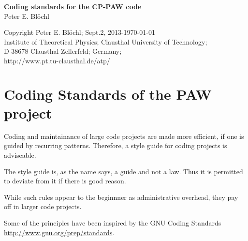 \documentclass[11pt,a4paper]{report}
\begin{document}
\begin{titlepage}
\begin{center}
\vspace*{3.5cm}
{\huge \textbf{Coding standards for the CP-PAW code}}\\
\vspace{0.5cm}
{\large Peter E. Bl\"ochl}
\vspace{0.5cm} 
\end{center}

\vfill
\begin{center}
Copyright Peter E. Bl\"ochl; Sept.2, 2013-\today\\
{\small
Institute of Theoretical Physics;
Clausthal University of Technology;\\ 
D-38678 Clausthal Zellerfeld; Germany;\\
http://www.pt.tu-clausthal.de/atp/}
\end{center}
\end{titlepage}
\noindent            
\tableofcontents
\chapter{Coding Standards of the PAW project}
Coding and maintainance of large code projects are made more
efficient, if one is guided by recurring patterns. Therefore, a style
guide for coding projects is adviseable.

The style guide is, as the name says, a guide and not a law. Thus it
is permitted to deviate from it if there is good reason.

While such rules appear to the beginnner as administrative overhead,
they pay off in larger code projects.

Some of the principles have been inspired by the GNU Coding Standards\\
\url{http://www.gnu.org/prep/standards}.
%
\end{document}
